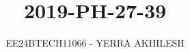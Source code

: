 \documentclass[journal]{IEEEtran}
\begin{document}

\vspace{3cm}

\title{2019-PH-27-39}
\author{EE24BTECH11066 - YERRA AKHILESH
}
{\let\newpage\relax\maketitle}

\renewcommand{\thefigure}{\theenumi}
\renewcommand{\thetable}{\theenumi}
\setlength{\intextsep}{10pt} %


\renewcommand{\thetable}{\theenumi}
\end{document}
